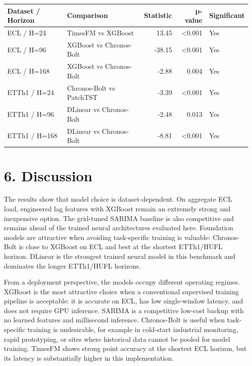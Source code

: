 {\def\LTcaptype{none} %
\begin{longtable}[]{@{}llrrl@{}}
\toprule\noalign{}
Dataset / Horizon & Comparison & Statistic & p-value & Significant \\
\midrule\noalign{}
\endhead
\bottomrule\noalign{}
\endlastfoot
ECL / H=24 & TimesFM vs XGBoost & 13.45 & \textless0.001 & Yes \\
ECL / H=96 & XGBoost vs Chronos-Bolt & -38.15 & \textless0.001 & Yes \\
ECL / H=168 & XGBoost vs Chronos-Bolt & -2.88 & 0.004 & Yes \\
ETTh1 / H=24 & Chronos-Bolt vs PatchTST & -3.39 & \textless0.001 &
Yes \\
ETTh1 / H=96 & DLinear vs Chronos-Bolt & -2.48 & 0.013 & Yes \\
ETTh1 / H=168 & DLinear vs Chronos-Bolt & -8.81 & \textless0.001 &
Yes \\
\end{longtable}
}

\section{6. Discussion}\label{discussion}

The results show that model choice is dataset-dependent. On aggregate
ECL load, engineered lag features with XGBoost remain an extremely
strong and inexpensive option. The grid-tuned SARIMA baseline is also
competitive and remains ahead of the trained neural architectures
evaluated here. Foundation models are attractive when avoiding
task-specific training is valuable: Chronos-Bolt is close to XGBoost on
ECL and best at the shortest ETTh1/HUFL horizon. DLinear is the
strongest trained neural model in this benchmark and dominates the
longer ETTh1/HUFL horizons.

From a deployment perspective, the models occupy different operating
regimes. XGBoost is the most attractive choice when a conventional
supervised training pipeline is acceptable: it is accurate on ECL, has
low single-window latency, and does not require GPU inference. SARIMA is
a competitive low-cost backup with no learned features and millisecond
inference. Chronos-Bolt is useful when task-specific training is
undesirable, for example in cold-start industrial monitoring, rapid
prototyping, or sites where historical data cannot be pooled for model
training. TimesFM shows strong point accuracy at the shortest ECL
horizon, but its latency is substantially higher in this implementation.

